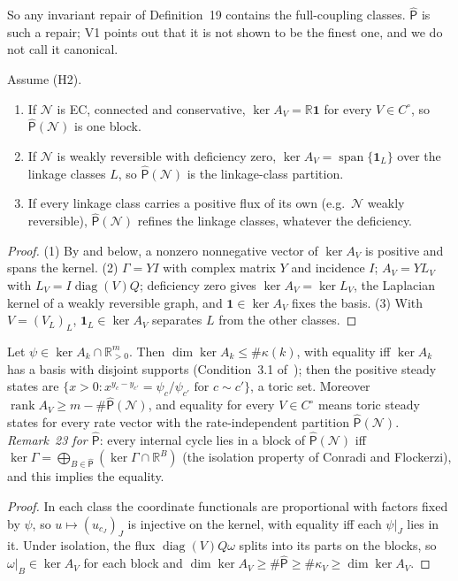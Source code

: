 \documentclass[11pt,a4paper]{report}
\newcommand{\Net}{\mathcal{N}}
\newcommand{\spn}{\operatorname{span}}
\newcommand{\Ph}{\widehat{\mathsf{P}}}
\newcommand{\Rp}{\mathbb{R}_{>0}}
\begin{document}
So any invariant repair of Definition~19 contains the full-coupling classes. \(\Ph\) is such a repair; V1 points out
that it is not shown to be the finest one, and we do not call it canonical.

\begin{theorem}[structure of \(\Ph\); agents Q2, E2]\label{thm:Phat-structure}
Assume (H2).
\begin{enumerate}
\item If \(\Net\) is EC, connected and conservative, \(\ker A_V=\mathbb{R}\mathbf 1\) for every \(V\in C^\circ\), so
\(\Ph(\Net)\) is one block.
\item If \(\Net\) is weakly reversible with deficiency zero, \(\ker A_V=\spn\{\mathbf 1_L\}\) over the linkage classes
\(L\), so \(\Ph(\Net)\) is the linkage-class partition.
\item If every linkage class carries a positive flux of its own (e.g.\ \(\Net\) weakly reversible), \(\Ph(\Net)\)
refines the linkage classes, whatever the deficiency.
\end{enumerate}
\end{theorem}
\begin{proof}
(1) By  and  below, a nonzero nonnegative vector of \(\ker A_V\) is positive and spans
the kernel. (2) \(\Gamma=YI\) with complex matrix \(Y\) and incidence \(I\); \(A_V=YL_V\) with \(L_V=I\operatorname{diag}(V)Q\);
deficiency zero gives \(\ker A_V=\ker L_V\), the Laplacian kernel of a weakly reversible graph, and
\(\mathbf 1\in\ker A_V\) fixes the basis. (3) With \(V=(V_L)_L\), \(\mathbf 1_L\in\ker A_V\) separates \(L\) from the
other classes.
\end{proof}

\begin{proposition}\label{prop:toric}
Let \(\psi\in\ker A_k\cap\Rp^m\). Then \(\dim\ker A_k\le\#\kappa(k)\), with equality iff \(\ker A_k\) has a basis with
disjoint supports (Condition~3.1 of~\autocite{PerezMillan2012}); then the positive steady states are
\(\{x>0:x^{y_c-y_{c'}}=\psi_c/\psi_{c'}\text{ for }c\sim c'\}\), a toric set. Moreover
\(\operatorname{rank}A_V\ge m-\#\Ph(\Net)\), and equality for every \(V\in C^\circ\) means toric steady states for
every rate vector with the rate-independent partition \(\Ph(\Net)\). \emph{Remark~23 for \(\Ph\)}: every internal
cycle lies in a block of \(\Ph(\Net)\) iff \(\ker\Gamma=\bigoplus_{B\in\Ph}(\ker\Gamma\cap\mathbb{R}^B)\) (the
isolation property of Conradi and Flockerzi), and this implies the equality.
\end{proposition}
\begin{proof}
In each class the coordinate functionals are proportional with factors fixed by \(\psi\), so
\(u\mapsto(u_{c_J})_J\) is injective on the kernel, with equality iff each \(\psi|_J\) lies in it. Under isolation,
the flux \(\operatorname{diag}(V)Q\omega\) splits into its parts on the blocks, so \(\omega|_B\in\ker A_V\) for each
block and \(\dim\ker A_V\ge\#\Ph\ge\#\kappa_V\ge\dim\ker A_V\).
\end{proof}
\end{document}
